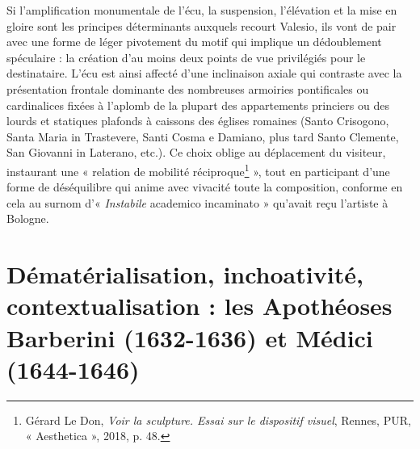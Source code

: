 \documentclass[12pt,twoside,openany]{book}
\begin{document}
Si l’amplification monumentale de l’écu, la suspension, l’élévation et la mise en gloire sont les principes déterminants auxquels recourt Valesio, ils vont de pair avec une forme de léger pivotement du motif qui implique un dédoublement spéculaire : la création d’au moins deux points de vue privilégiés pour le destinataire. L’écu est ainsi affecté d’une inclinaison axiale qui contraste avec la présentation frontale dominante des nombreuses armoiries pontificales ou cardinalices fixées à l’aplomb de la plupart des appartements princiers ou des lourds et statiques plafonds à caissons des églises romaines (Santo Crisogono, Santa Maria in Trastevere, Santi Cosma e Damiano, plus tard Santo Clemente, San Giovanni in Laterano, etc.). Ce choix oblige au déplacement du visiteur, instaurant une « relation de mobilité réciproque\footnote{Gérard Le Don, \textit{Voir la sculpture. Essai sur le dispositif visuel}, Rennes, PUR, « Aesthetica », 2018, p. 48.} », tout en participant d’une forme de déséquilibre qui anime avec vivacité toute la composition, conforme en cela au surnom d’« \textit{Instabile} academico incaminato » qu’avait reçu l’artiste à Bologne.

\section{Dématérialisation, inchoativité, contextualisation : les Apothéoses Barberini (1632-1636) et Médici (1644-1646)}
\end{document}
